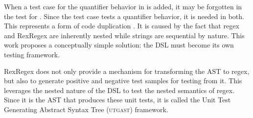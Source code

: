 When a test case for the quantifier behavior in  is added, it may be forgotten in the test for . Since the test case tests a quantifier behavior, it is needed in both. This represents a form of code duplication \cite[p.~4]{refactoring}. It is caused by the fact that regex and RexRegex are inherently nested while strings are sequential by nature. This work proposes a conceptually simple solution: the DSL must become its own testing framework.

RexRegex does not only provide a mechanism for transforming the AST to regex, but also to generate positive and negative test samples for testing from it. This leverages the nested nature of the DSL to test the nested semantics of regex. Since it is the AST that produces these unit tests, it is called the Unit Test Generating Abstract Syntax Tree (\textsc{utgast}) framework.

